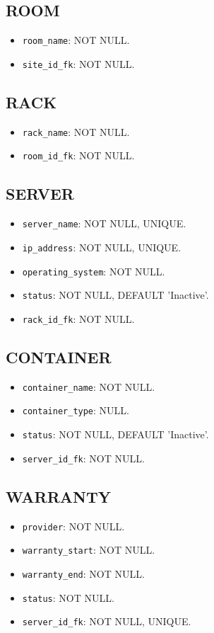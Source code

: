 \subsection{ROOM}
\begin{itemize}
    \item \texttt{room\_name}: NOT NULL.
    \item \texttt{site\_id\_fk}: NOT NULL.
\end{itemize}

\subsection{RACK}
\begin{itemize}
    \item \texttt{rack\_name}: NOT NULL.
    \item \texttt{room\_id\_fk}: NOT NULL.
\end{itemize}

\subsection{SERVER}
\begin{itemize}
    \item \texttt{server\_name}: NOT NULL, UNIQUE.
    \item \texttt{ip\_address}: NOT NULL, UNIQUE.
    \item \texttt{operating\_system}: NOT NULL.
    \item \texttt{status}: NOT NULL, DEFAULT 'Inactive'.
    \item \texttt{rack\_id\_fk}: NOT NULL.
\end{itemize}

\subsection{CONTAINER}
\begin{itemize}
    \item \texttt{container\_name}: NOT NULL.
    \item \texttt{container\_type}: NULL.
    \item \texttt{status}: NOT NULL, DEFAULT 'Inactive'.
    \item \texttt{server\_id\_fk}: NOT NULL.
\end{itemize}

\subsection{WARRANTY}
\begin{itemize}
    \item \texttt{provider}: NOT NULL.
    \item \texttt{warranty\_start}: NOT NULL.
    \item \texttt{warranty\_end}: NOT NULL.
    \item \texttt{status}: NOT NULL.
    \item \texttt{server\_id\_fk}: NOT NULL, UNIQUE.
\end{itemize}

